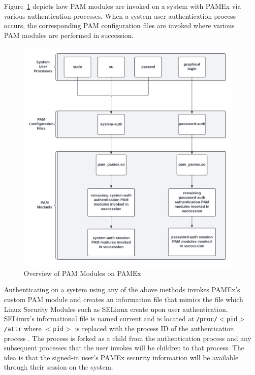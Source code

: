 Figure~\ref{PAM Diagram} depicts how PAM modules are invoked on a system with PAMEx via various authentication processes.
When a system user authentication process occurs, the corresponding PAM configuration files are invoked where various PAM
modules are performed in succession.
\clearpage
\begin{figure}[h]
\centering
\includegraphics[width=.9\textwidth]{section04/assets/pam_overview.png}
\caption[Overview of PAM Modules on PAMEx]{\label{PAM Diagram}Overview of PAM Modules on PAMEx}
\end{figure}

Authenticating on a system using any of the above methods invokes PAMEx’s 
custom PAM module and creates an information file that mimics the file 
which Linux Security Modules such as SELinux create upon user 
authentication. SELinux’s informational file is named current and is 
located at \texttt{/proc/$<$pid$>$/attr} where \texttt{$<$pid$>$} is replaced with the process 
ID of the authentication process \cite{selinux}. The process is forked as a child from the 
authentication process and any subsequent processes that the user invokes will be children to
that process. The idea is that the signed-in user's PAMEx security information will be available
through their session on the system.

